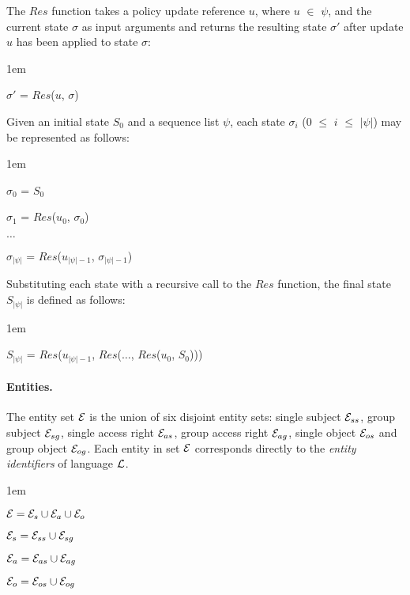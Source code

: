 \documentclass[11pt, twocolumn]{article}
\newenvironment{vquote}
  {\begin{list}{}{\leftmargin 1em}\item[]}
  {\end{list}}
\begin{document}
        The $Res$ function takes a policy update reference $u$, where $u$
        $\in$ $\psi$, and the current state $\sigma$ as input arguments and
        returns the resulting state $\sigma'$ after update $u$ has been applied
        to state $\sigma$:

        \begin{vquote}
          $\sigma'$ = $Res$($u$, $\sigma$)
        \end{vquote}

        Given an initial state $S_{0}$ and a sequence list $\psi$, each state
        $\sigma_{i}$ ($0$ $\leq$ $i$ $\leq$ $|\psi|$) may be represented as
        follows:

        \begin{vquote}
          $\sigma_{0}$ = $S_{0}$

          $\sigma_{1}$ = $Res$($u_{0}$, $\sigma_{0}$)

          $\ldots$

          $\sigma_{|\psi|}$ = $Res$($u_{|\psi| - 1}$, $\sigma_{|\psi| - 1}$)
        \end{vquote}

        Substituting each state with a recursive call to the $Res$ function,
        the final state $S_{|\psi|}$ is defined as follows:

        \begin{vquote}
          $S_{|\psi|}$ = $Res$($u_{|\psi| - 1}$, $Res$($\ldots$, $Res$($u_{0}$, $S_{0}$)))
        \end{vquote}

        \paragraph{Entities.}

          The entity set ${\cal E}$ is the union of six disjoint entity sets:
          single subject ${\cal E}_{ss}$, group subject ${\cal E}_{sg}$,
          single access right ${\cal E}_{as}$, group access right
          ${\cal E}_{ag}$, single object ${\cal E}_{os}$ and group object
          ${\cal E}_{og}$. Each entity in set ${\cal E}$ corresponds directly
          to the {\em entity identifiers} of language ${\cal L}$.

          \begin{vquote}
            ${\cal E} = {\cal E}_{s} \cup {\cal E}_{a} \cup {\cal E}_{o}$

            ${\cal E}_{s} = {\cal E}_{ss} \cup {\cal E}_{sg}$

            ${\cal E}_{a} = {\cal E}_{as} \cup {\cal E}_{ag}$

            ${\cal E}_{o} = {\cal E}_{os} \cup {\cal E}_{og}$
          \end{vquote}
\end{document}
